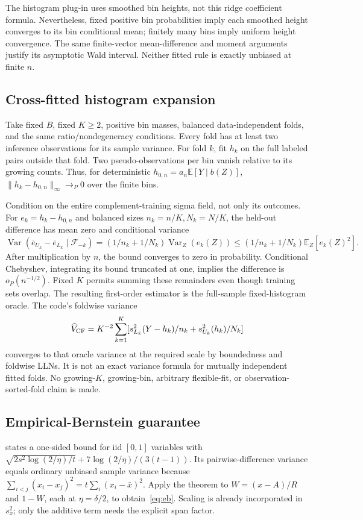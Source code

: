 \documentclass{article}
\newcommand{\E}{\mathbb{E}}
\newcommand{\Var}{\operatorname{Var}}
\begin{document}
The histogram plug-in uses smoothed bin heights, not this ridge coefficient formula. Nevertheless, fixed positive bin probabilities imply each smoothed height converges to its bin conditional mean; finitely many bins imply uniform height convergence. The same finite-vector mean-difference and moment arguments justify its asymptotic Wald interval. Neither fitted rule is exactly unbiased at finite $n$.

\subsection{Cross-fitted histogram expansion}
Take fixed $B$, fixed $K\ge2$, positive bin masses, balanced data-independent folds, and the same ratio/nondegeneracy conditions. Every fold has at least two inference observations for its sample variance. For fold $k$, fit $h_k$ on the full labeled pairs outside that fold. Two pseudo-observations per bin vanish relative to its growing counts. Thus, for deterministic $h_{0,n}=a_n\E[Y\mid b(Z)]$, $\|h_k-h_{0,n}\|_\infty\to_P0$ over the finite bins.

Condition on the entire complement-training sigma field, not only its outcomes. For $e_k=h_k-h_{0,n}$ and balanced sizes $n_k=n/K,N_k=N/K$, the held-out difference has mean zero and conditional variance
\[
 \Var(\overline e_{U_k}-\overline e_{L_k}\mid\mathcal F_{-k})
 =(1/n_k+1/N_k)\Var_Z(e_k(Z))
 \le (1/n_k+1/N_k)\E_Z[e_k(Z)^2].
\]
After multiplication by $n$, the bound converges to zero in probability. Conditional Chebyshev, integrating its bound truncated at one, implies the difference is $o_P(n^{-1/2})$. Fixed $K$ permits summing these remainders even though training sets overlap. The resulting first-order estimator is the full-sample fixed-histogram oracle. The code's foldwise variance
\[
 \widehat V_{\rm CF}=K^{-2}\sum_{k=1}^K
 [s_{L_k}^2(Y-h_k)/n_k+s_{U_k}^2(h_k)/N_k]
\]
converges to that oracle variance at the required scale by boundedness and foldwise LLNs. It is not an exact variance formula for mutually independent fitted folds. No growing-$K$, growing-bin, arbitrary flexible-fit, or observation-sorted-fold claim is made.

\subsection{Empirical-Bernstein guarantee}
\citet[Theorem 4]{maurer2009} states a one-sided bound for iid $[0,1]$ variables with $\sqrt{2s^2\log(2/\eta)/t}+7\log(2/\eta)/(3(t-1))$. Its pairwise-difference variance equals ordinary unbiased sample variance because $\sum_{i<j}(x_i-x_j)^2=t\sum_i(x_i-\bar x)^2$. Apply the theorem to $W=(x-A)/R$ and $1-W$, each at $\eta=\delta/2$, to obtain~\eqref{eq:eb}. Scaling is already incorporated in $s_x^2$; only the additive term needs the explicit span factor.
\end{document}
